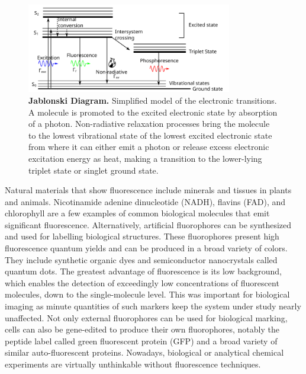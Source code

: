 \begin{figure}
	\centering
	\includegraphics[width=0.8\textwidth]{jablonski}
	\caption{\textbf{Jablonski Diagram.}
	Simplified model of the electronic transitions. A molecule is promoted to the excited electronic state by absorption of a photon.
	Non-radiative relaxation processes bring the molecule to the lowest vibrational state of the lowest excited electronic state from where it can either emit a photon or release excess electronic excitation energy as heat, making a transition to the lower-lying triplet state or singlet ground state.}
	\label{fig:jablonski}
\end{figure}

Natural materials that show fluorescence include minerals and tissues in plants and animals.
Nicotinamide adenine dinucleotide (NADH), flavins (FAD), and chlorophyll are a few examples of common biological molecules that emit significant fluorescence.\cite{blacker2014separating,siano1989nadh,genty1989the}
Alternatively, artificial fluorophores can be synthesized and used for labelling biological structures. These fluorophores present high fluorescence quantum yields and can be produced in a broad variety of colors. They include synthetic organic dyes and semiconductor nanocrystals called quantum dots.\cite{atkinson1952the,alivisatos1996semiconductor}
The greatest advantage of fluorescence is its low background, which enables the detection of exceedingly low concentrations of fluorescent molecules, down to the single-molecule level.
This was important for biological imaging as minute quantities of such markers keep the system under study nearly unaffected.\cite{white1987an}
Not only external fluorophores can be used for biological marking, cells can also be gene-edited to produce their own fluorophores, notably the peptide label called green fluorescent protein (GFP) and a broad variety of similar auto-fluorescent proteins.\cite{tsien1998the,chalfie1994green}
Nowadays, biological or analytical chemical experiments are virtually unthinkable without fluorescence techniques.

